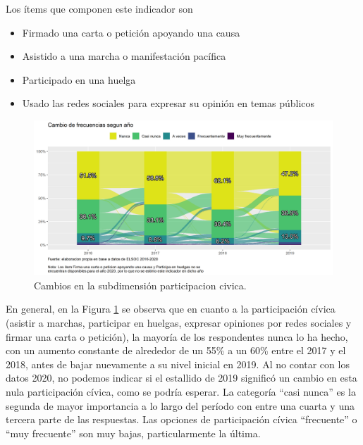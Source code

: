 \documentclass[
  12pt,
]{book}
\begin{document}
Los ítems que componen este indicador son

\begin{itemize}
\item
  Firmado una carta o petición apoyando una causa
\item
  Asistido a una marcha o manifestación pacífica
\item
  Participado en una huelga
\item
  Usado las redes sociales para expresar su opinión en temas públicos
\end{itemize}

\begin{figure}[H]

{\centering \includegraphics[width=1\linewidth,height=1\textheight]{output/graphs/alluvial_participacion} 

}

\caption{Cambios en la subdimensión participacion civica.}\label{fig:alluvial-participacion}
\end{figure}

En general, en la Figura \ref{fig:alluvial-participacion} se observa que en cuanto a la participación cívica (asistir a marchas, participar en huelgas, expresar opiniones por redes sociales y firmar una carta o petición), la mayoría de los respondentes nunca lo ha hecho, con un aumento constante de alrededor de un 55\% a un 60\% entre el 2017 y el 2018, antes de bajar nuevamente a su nivel inicial en 2019. Al no contar con los datos 2020, no podemos indicar si el estallido de 2019 significó un cambio en esta nula participación cívica, como se podría esperar. La categoría ``casi nunca'' es la segunda de mayor importancia a lo largo del período con entre una cuarta y una tercera parte de las respuestas. Las opciones de participación cívica ``frecuente'' o ``muy frecuente'' son muy bajas, particularmente la última.
\end{document}
